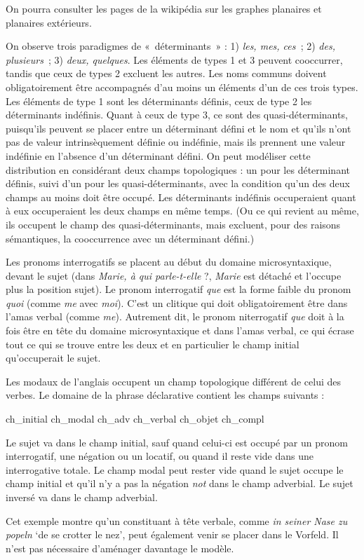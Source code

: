 {    On pourra consulter les pages de la wikipédia sur les graphes planaires et planaires extérieurs.

     On observe trois paradigmes de «~déterminants~» : 1) \textit{les, mes, ces~}; 2) \textit{des, plusieurs~}; 3) \textit{deux, quelques}. Les éléments de types 1 et 3 peuvent cooccurrer, tandis que ceux de types 2 excluent les autres. Les noms communs doivent obligatoirement être accompagnés d’au moins un éléments d’un de ces trois types. Les éléments de type 1 sont les déterminants définis, ceux de type 2 les déterminants indéfinis. Quant à ceux de type 3, ce sont des quasi-déterminants, puisqu’ils peuvent se placer entre un déterminant défini et le nom et qu’ils n’ont pas de valeur intrinsèquement définie ou indéfinie, mais ils prennent une valeur indéfinie en l’absence d’un déterminant défini. On peut modéliser cette distribution en considérant deux champs topologiques : un pour les déterminant définis, suivi d’un pour les quasi-déterminants, avec la condition qu’un des deux champs au moins doit être occupé. Les déterminants indéfinis occuperaient quant à eux occuperaient les deux champs en même temps. (Ou ce qui revient au même, ils occupent le champ des quasi-déterminants, mais excluent, pour des raisons sémantiques, la cooccurrence avec un déterminant défini.)

     Les pronoms interrogatifs se placent au début du domaine microsyntaxique, devant le sujet (dans \textit{Marie, à qui parle-t-elle} ?, \textit{Marie} est détaché et l’occupe plus la position sujet). Le pronom interrogatif \textit{que} est la forme faible du pronom \textit{quoi} (comme \textit{me} avec \textit{moi}). C’est un clitique qui doit obligatoirement être dans l’amas verbal (comme \textit{me}). Autrement dit, le pronom niterrogatif \textit{que} doit à la fois être en tête du domaine microsyntaxique et dans l’amas verbal, ce qui écrase tout ce qui se trouve entre les deux et en particulier le champ initial qu’occuperait le sujet.

     Les modaux de l’anglais occupent un champ topologique différent de celui des verbes. Le domaine de la phrase déclarative contient les champs suivants :

    ch\_initial {\textbar} ch\_modal {\textbar} ch\_adv {\textbar} ch\_verbal {\textbar} ch\_objet {\textbar} ch\_compl

    Le sujet va dans le champ initial, sauf quand celui-ci est occupé par un pronom interrogatif, une négation ou un locatif, ou quand il reste vide dans une interrogative totale. Le champ modal peut rester vide quand le sujet occupe le champ initial et qu’il n’y a pas la négation \textit{not} dans le champ adverbial. Le sujet inversé va dans le champ adverbial.

     Cet exemple montre qu’un constituant à tête verbale, comme \textit{in seiner Nase zu popeln} ‘de se crotter le nez’, peut également venir se placer dans le Vorfeld. Il n’est pas nécessaire d’aménager davantage le modèle.
}
